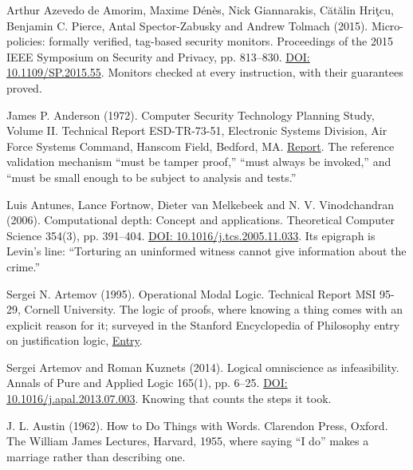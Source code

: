 \documentclass[11pt,twoside]{article}
\theoremstyle{thielethm}
\theoremstyle{thieledef}
\theoremstyle{thieledef}
\theoremstyle{thieledef}
\theoremstyle{thielethm}
\theoremstyle{thieleobs}
\theoremstyle{thielethm}
\begin{document}
\noindent Arthur Azevedo de Amorim, Maxime D\'en\`es, Nick Giannarakis, C\u{a}t\u{a}lin Hri\c{t}cu, Benjamin C. Pierce, Antal Spector-Zabusky and Andrew Tolmach (2015). Micro-policies: formally verified, tag-based security monitors. Proceedings of the 2015 IEEE Symposium on Security and Privacy, pp. 813--830. \href{https://doi.org/10.1109/SP.2015.55}{DOI: 10.1109/SP.2015.55}. Monitors checked at every instruction, with their guarantees proved.
\par\medskip

\noindent James P. Anderson (1972). Computer Security Technology Planning Study, Volume II. Technical Report ESD-TR-73-51, Electronic Systems Division, Air Force Systems Command, Hanscom Field, Bedford, MA. \href{https://csrc.nist.gov/csrc/media/publications/conference-paper/1998/10/08/proceedings-of-the-21st-nissc-1998/documents/early-cs-papers/ande72.pdf}{Report}. The reference validation mechanism ``must be tamper proof,'' ``must always be invoked,'' and ``must be small enough to be subject to analysis and tests.''
\par\medskip

\noindent Luis Antunes, Lance Fortnow, Dieter van Melkebeek and N. V. Vinodchandran (2006). Computational depth: Concept and applications. Theoretical Computer Science 354(3), pp. 391--404. \href{https://doi.org/10.1016/j.tcs.2005.11.033}{DOI: 10.1016/j.tcs.2005.11.033}. Its epigraph is Levin's line: ``Torturing an uninformed witness cannot give information about the crime.''
\par\medskip

\noindent Sergei N. Artemov (1995). Operational Modal Logic. Technical Report MSI 95-29, Cornell University. The logic of proofs, where knowing a thing comes with an explicit reason for it; surveyed in the Stanford Encyclopedia of Philosophy entry on justification logic, \href{https://plato.stanford.edu/entries/logic-justification/}{Entry}.
\par\medskip

\noindent Sergei Artemov and Roman Kuznets (2014). Logical omniscience as infeasibility. Annals of Pure and Applied Logic 165(1), pp. 6--25. \href{https://doi.org/10.1016/j.apal.2013.07.003}{DOI: 10.1016/j.apal.2013.07.003}. Knowing that counts the steps it took.
\par\medskip

\noindent J. L. Austin (1962). How to Do Things with Words. Clarendon Press, Oxford. The William James Lectures, Harvard, 1955, where saying ``I do'' makes a marriage rather than describing one.
\par\medskip
\end{document}

